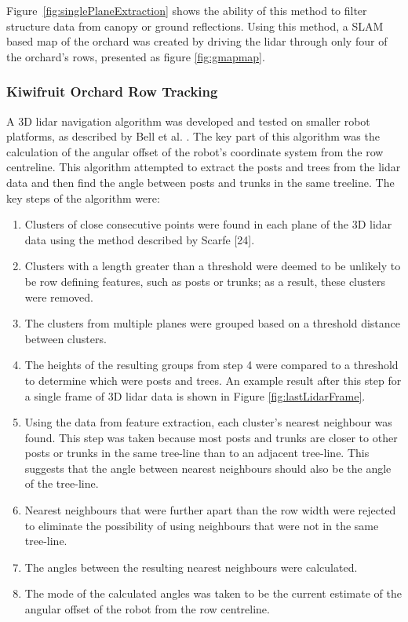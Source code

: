 \documentclass[preprint,authoryear,12pt]{elsarticle}
\begin{document}
        Figure~\ref{fig:singlePlaneExtraction} shows the ability of this method to filter structure data from canopy or ground reflections.
        Using this method, a SLAM based map of the orchard was created by driving the lidar through only four of the orchard's rows, presented as figure \ref{fig:gmapmap}.


    \subsubsection{Kiwifruit Orchard Row Tracking}
        A 3D lidar navigation algorithm was developed and tested on smaller robot platforms, as described by Bell et al. \citep{Bell2016}. The key part of this algorithm was the calculation of the angular offset of the robot’s coordinate system from the row centreline. This algorithm attempted to extract the posts and trees from the lidar data and then find the angle between posts and trunks in the same treeline. The key steps of the algorithm were:
        \begin{enumerate}
        \item Clusters of close consecutive points were found in each plane of the 3D lidar data using the method described by Scarfe [24]⁠.
        \item Clusters with a length greater than a threshold were deemed to be unlikely to be row defining features, such as posts or trunks; as a result, these clusters were removed.
        \item The clusters from multiple planes were grouped based on a threshold distance between clusters.
        \item The heights of the resulting groups from step 4 were compared to a threshold to determine which were posts and trees. An example result after this step for a single frame of 3D lidar data is shown in Figure \ref{fig:lastLidarFrame}.
        \item Using the data from feature extraction, each cluster’s nearest neighbour was found. This step was taken because most posts and trunks are closer to other posts or trunks in the same tree-line than to an adjacent tree-line. This suggests that the angle between nearest neighbours should also be the angle of the tree-line.
        \item Nearest neighbours that were further apart than the row width were rejected to eliminate the possibility of using neighbours that were not in the same tree-line.
        \item The angles between the resulting nearest neighbours were calculated.
        \item The mode of the calculated angles was taken to be the current estimate of the angular offset of the robot from the row centreline.
        \end{enumerate}
\end{document}
